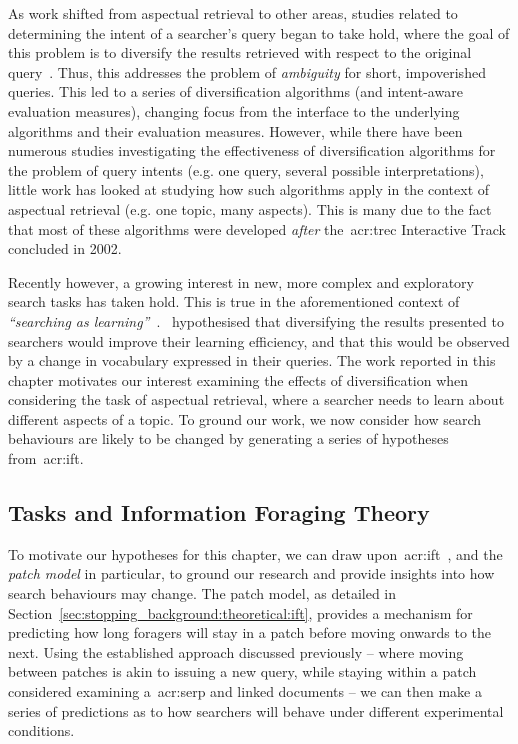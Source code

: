 As work shifted from aspectual retrieval to other areas, studies related to determining the intent of a searcher's query began to take hold, where the goal of this problem is to diversify the results retrieved with respect to the original query~\citep{rose2004understanding_user_goals}. Thus, this addresses the problem of \emph{ambiguity} for short, impoverished queries. This led to a series of diversification algorithms (and intent-aware evaluation measures), changing focus from the interface to the underlying algorithms and their evaluation measures. However, while there have been numerous studies investigating the effectiveness of diversification algorithms for the problem of query intents (e.g. one query, several possible interpretations), little work has looked at studying how such algorithms apply in the context of aspectual retrieval (e.g. one topic, many aspects). This is many due to the fact that most of these algorithms were developed \emph{after} the~\gls{acr:trec} Interactive Track concluded in 2002.

Recently however, a growing interest in new, more complex and exploratory search tasks has taken hold. This is true in the aforementioned context of \emph{``searching as learning''}~\citep{collins2017sal}.~\cite{syed2017sal} hypothesised that diversifying the results presented to searchers would improve their learning efficiency, and that this would be observed by a change in vocabulary expressed in their queries. The work reported in this chapter motivates our interest examining the effects of diversification when considering the task of aspectual retrieval, where a searcher needs to learn about different aspects of a topic. To ground our work, we now consider how search behaviours are likely to be changed by generating a series of hypotheses from~\gls{acr:ift}.

\subsection{Tasks and Information Foraging Theory}\label{sec:diversity:background:tasks}
To motivate our hypotheses for this chapter, we can draw upon~\gls{acr:ift}~\citep{pirolli1999ift}, and the \emph{patch model} in particular, to ground our research and provide insights into how search behaviours may change. The patch model, as detailed in Section~\ref{sec:stopping_background:theoretical:ift}, provides a mechanism for predicting how long foragers will stay in a patch before moving onwards to the next. Using the established approach discussed previously -- where moving between patches is akin to issuing a new query, while staying within a patch considered examining a~\gls{acr:serp} and linked documents -- we can then make a series of predictions as to how searchers will behave under different experimental conditions.

